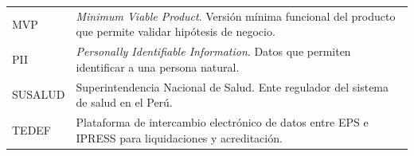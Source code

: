 \begin{table}[H]
\begin{tabularx}{\textwidth}{@{}p{}X@{}}
MVP &
\textit{Minimum Viable Product}. Versión mínima funcional del producto que permite validar hipótesis de negocio. \\

PII &
\textit{Personally Identifiable Information}. Datos que permiten identificar a una persona natural. \\

SUSALUD &
Superintendencia Nacional de Salud. Ente regulador del sistema de salud en el Perú. \\

TEDEF &
Plataforma de intercambio electrónico de datos entre EPS e IPRESS para liquidaciones y acreditación. \\

\bottomrule
\end{tabularx}
\end{table}